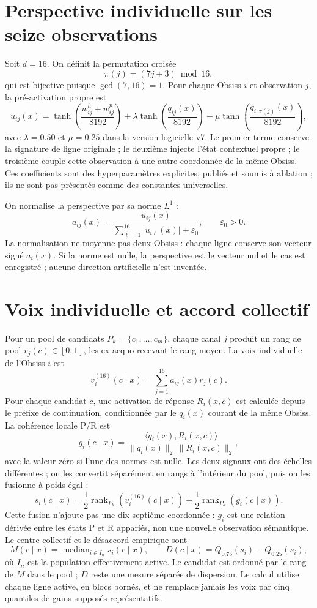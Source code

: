 \documentclass[11pt,a4paper]{report}
\newcommand{\Rank}{\operatorname{rank}}
\begin{document}
\section{Perspective individuelle sur les seize observations}
Soit $d=16$. On définit la permutation croisée
\[
\pi(j)=(7j+3)\bmod 16,
\]
qui est bijective puisque $\gcd(7,16)=1$. Pour chaque Obsiss $i$ et observation $j$, la pré-activation propre est
\[
u_{ij}(x)=\tanh\!\left(\frac{w^h_{ij}+w^p_{ij}}{8192}\right)
 +\lambda\tanh\!\left(\frac{q_{ij}(x)}{8192}\right)
 +\mu\tanh\!\left(\frac{q_{i,\pi(j)}(x)}{8192}\right),
\]
avec $\lambda=0.50$ et $\mu=0.25$ dans la version logicielle v7. Le premier terme conserve la signature de ligne originale ; le deuxième injecte l'état contextuel propre ; le troisième couple cette observation à une autre coordonnée de la même Obsiss. Ces coefficients sont des hyperparamètres explicites, publiés et soumis à ablation ; ils ne sont pas présentés comme des constantes universelles.

On normalise la perspective par sa norme $L^1$ :
\[
a_{ij}(x)=\frac{u_{ij}(x)}{\sum_{\ell=1}^{16}|u_{i\ell}(x)|+\varepsilon_0},\qquad \varepsilon_0>0.
\]
La normalisation ne moyenne pas deux Obsiss : chaque ligne conserve son vecteur signé $a_i(x)$. Si la norme est nulle, la perspective est le vecteur nul et le cas est enregistré ; aucune direction artificielle n'est inventée.

\section{Voix individuelle et accord collectif}
Pour un pool de candidats $P_k=\{c_1,\ldots,c_m\}$, chaque canal $j$ produit un rang de pool $r_j(c)\in[0,1]$, les ex-aequo recevant le rang moyen. La voix individuelle de l'Obsiss $i$ est
\[
v_i^{(16)}(c\mid x)=\sum_{j=1}^{16}a_{ij}(x)r_j(c).
\]
Pour chaque candidat $c$, une activation de réponse $R_i(x,c)$ est calculée depuis le préfixe de continuation, conditionnée par le $q_i(x)$ courant de la même Obsiss. La cohérence locale P/R est
\[
g_i(c\mid x)=\frac{\langle q_i(x),R_i(x,c)\rangle}
 {\|q_i(x)\|_2\,\|R_i(x,c)\|_2},
\]
avec la valeur zéro si l'une des normes est nulle. Les deux signaux ont des échelles différentes ; on les convertit séparément en rangs à l'intérieur du pool, puis on les fusionne à poids égal :
\[
s_i(c\mid x)=\frac{1}{2}\Rank_{P_k}(v_i^{(16)}(c\mid x))
              +\frac{1}{2}\Rank_{P_k}(g_i(c\mid x)).
\]
Cette fusion n'ajoute pas une dix-septième coordonnée : $g_i$ est une relation dérivée entre les états P et R appariés, non une nouvelle observation sémantique. Le centre collectif et le désaccord empirique sont
\[
M(c\mid x)=\operatorname{median}_{i\in I_n}s_i(c\mid x),\qquad
D(c\mid x)=Q_{0.75}(s_i)-Q_{0.25}(s_i),
\]
où $I_n$ est la population effectivement active. Le candidat est ordonné par le rang de $M$ dans le pool ; $D$ reste une mesure séparée de dispersion. Le calcul utilise chaque ligne active, en blocs bornés, et ne remplace jamais les voix par cinq quantiles de gains supposés représentatifs.
\end{document}
